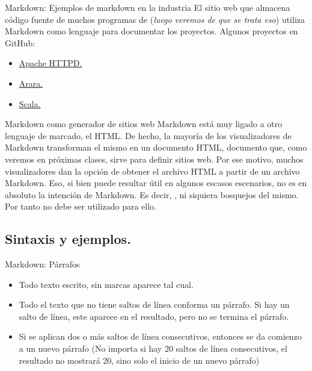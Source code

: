 
\begin{frame}{Markdown: Ejemplos de markdown en la industria}
  El sitio web  que almacena código fuente de muchos programas
  de  (\textit{luego veremos de que se trata eso}) utiliza
  Markdown como lenguaje para documentar los proyectos.
  \jump
  Algunos proyectos en GitHub:
  \begin{itemize}
    \item \href{https://github.com/apache/httpd}{Apache HTTPD.}
    \item \href{https://github.com/cereda/arara}{Arara.}
    \item \href{https://github.com/scala/scala}{Scala.}
  \end{itemize}
\end{frame}


\begin{frame}{Markdown como generador de sitios web}
  Markdown está muy ligado a otro lenguaje de marcado, el HTML. De hecho, la
  mayoría de los visualizadores de Markdown transforman el mismo en un documento
  HTML, documento que, como veremos en próximas clases, sirve para definir
  sitios web.
  \jump
  Por ese motivo, muchos visualizadores dan la opción de obtener el archivo HTML
  a partir de un archivo Markdown. Eso, si bien puede resultar útil en algunos
  escasos escenarios, no es en absoluto la intención de Markdown.
  \jump
  Es decir, , ni siquiera bosquejos del mismo. Por tanto no debe ser utilizado
  para ello.
\end{frame}


\subsection{Sintaxis y ejemplos.}


\begin{frame}{Markdown: Párrafos}
  \begin{itemize}
    \item Todo texto escrito, sin marcas aparece tal cual.
    \item Todo el texto que no tiene saltos de línea conforma un párrafo.
      Si hay un salto de línea, este aparece en el resultado, pero no se termina
      el párrafo.
    \item Si se aplican dos o más saltos de línea consecutivos, entonces se da
      comienzo a un nuevo párrafo (No importa si hay 20 saltos de línea
      consecutivos, el resultado no mostrará 20, sino solo el inicio de un nuevo
      párrafo)
  \end{itemize}
\end{frame}

